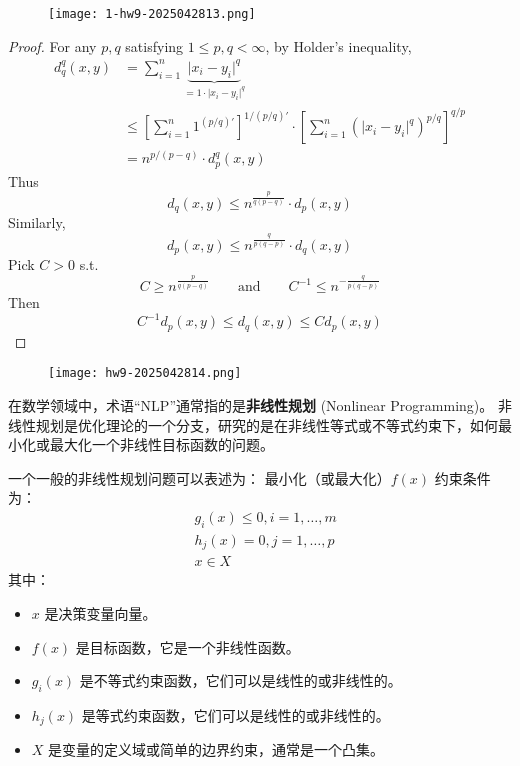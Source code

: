 \begin{exercise}
\begin{figure}[H]
\centering
\texttt{[image: 1-hw9-2025042813.png]}
\label{}
\end{figure}
\end{exercise}
\begin{proof}
For any $p,q$ satisfying $1\leq p,q<\infty$, by Holder's inequality,
\[
\begin{aligned}
d_{q}^{q}(x,y) & =\sum_{i=1}^{n} \underbrace{ \lvert x_i-y_i \rvert ^{q} }_{ =1\cdot\lvert x_i-y_i \rvert ^{q} } \\
 & \leq \left[ \sum_{i=1}^{n} 1^{(p/q)'} \right]^{1/(p/q )'}\cdot\left[ \sum_{i=1}^{n} (\lvert x_i-y_i \rvert ^{q})^{p/q }  \right]^{q/p} \\
 & =n^{p/(p-q)}\cdot d_{p}^{q}(x,y)
\end{aligned}
\]
Thus
\[
d_{q}(x,y)\leq n^{\frac{p}{q(p-q)}}\cdot d_{p}(x,y)
\]
Similarly,
\[
d_{p}(x,y)\leq n^{\frac{q}{p(q-p)}}\cdot d_{q}(x,y)
\]
Pick $C>0$ s.t.
\[
C\geq n^{\frac{p}{q(p-q)}}\qquad \text{and}\qquad C^{-1}\leq n^{-\frac{q}{p(q-p)}}
\]
Then
\[
C^{-1}d_{p}(x,y)\leq d_{q}(x,y)\leq Cd_{p}(x,y)
\]
\end{proof}

\begin{exercise}
\begin{figure}[H]
\centering
\texttt{[image: hw9-2025042814.png]}
\label{}
\end{figure}
\end{exercise}
在数学领域中，术语“NLP”通常指的是\textbf{非线性规划} (Nonlinear Programming)。
非线性规划是优化理论的一个分支，研究的是在非线性等式或不等式约束下，如何最小化或最大化一个非线性目标函数的问题。

一个一般的非线性规划问题可以表述为：
最小化（或最大化）$f(x)$
约束条件为：
\[
\begin{aligned}
& g_i(x) \leq 0, i=1, \ldots, m \\
& h_j(x)=0, j=1, \ldots, p \\
& x \in X
\end{aligned}
\]
其中：

\begin{itemize}
	\item $x$ 是决策变量向量。
	\item $f(x)$ 是目标函数，它是一个非线性函数。
	\item $g_i(x)$ 是不等式约束函数，它们可以是线性的或非线性的。
	\item $h_j(x)$ 是等式约束函数，它们可以是线性的或非线性的。
	\item $X$ 是变量的定义域或简单的边界约束，通常是一个凸集。
\end{itemize}

